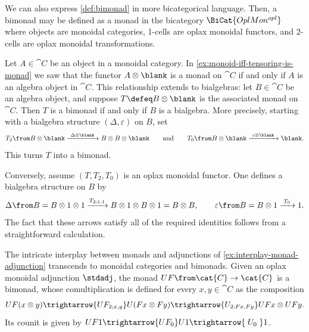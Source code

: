 \begin{remark}\label{rmk:bimonad-in-bicategorical-language}
  We can also express \cref{def:bimonad} in more bicategorical language.
  Then, a bimonad may be defined as a monad
  in the bicategory \(\BiCat{OplMon^{opl}}\) where
  objects are monoidal categories,
  1-cells are oplax monoidal functors,
  and 2-cells are oplax monoidal transformations.
\end{remark}

\begin{example}\label{ex:bialgebra-gives-rise-to-bimonad}
  Let \(A \in \cat{C}\) be an object in a monoidal category.
  In \cref{ex:monoid-iff-tensoring-is-monad}
  we saw that the functor \(A \otimes \blank\) is a monad on \(\cat{C}\)
  if and only if \(A\) is an algebra object in \(\cat{C}\).
  This relationship extends to bialgebras:
  let \(B \in \cat{C}\) be an algebra object,
  and suppose \(T \defeq B \otimes \blank\) is the associated monad on \(\cat{C}\).
  Then \(T\) is a bimonad if and only if \(B\) is a bialgebra.
  More precisely, starting with a bialgebra structure \((\Delta,\varepsilon)\) on \(B\), set
  \[
    T_2\from B \otimes \blank \xrightarrow{\ \Delta \otimes \blank\ } B \otimes B \otimes \blank
    \qquad\text{and}\qquad
    T_0\from B \otimes \blank \xrightarrow{\ \varepsilon \otimes \blank\ } \blank.
  \]
  This turns \(T\) into a bimonad.

  Conversely,
  assume \((T, T_2, T_0)\) is an oplax monoidal functor.
  One defines a bialgebra structure on \(B\) by
  \[
    \Delta \from B = B \otimes 1 \otimes 1 \xrightarrow{T_{2; 1, 1}} B \otimes 1 \otimes B \otimes 1 = B \otimes B, \qquad
    \varepsilon \from B = B \otimes 1 \xrightarrow{\;T_0\;} 1.
  \]
  The fact that these arrows satisfy all of the required identities follows from a straightforward calculation.
\end{example}

\begin{example}\label{ex:oplaxmonoidal-adjunction-gives-bimonad}
  The intricate interplay between monads and adjunctions
  of \cref{ex:interplay-monad-adjunction}
  transcends to monoidal categories and bimonads.
  Given an oplax monoidal adjunction \(\stdadj\),
  the monad \(UF \from \cat{C} \to \cat{C}\)
  is a bimonad,
  whose comultiplication is defined for every \(x,y \in \cat{C}\) as the composition
  \[
    UF(x \otimes y)
    \trightarrow{UF_{2;x,y}}
    U(F x \otimes F y)
    \trightarrow{U_{2; F x,F y}}
    UF x \otimes UF y.
  \]
  Its counit is given by \(UF 1 \trightarrow{U F_0} U1 \trightarrow{\;U_0\;} 1\).
\end{example}

